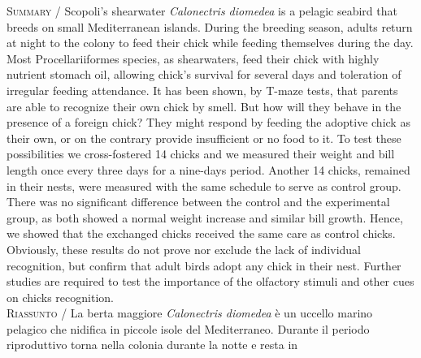 {\small
\noindent \textsc{\color{MUSEBLUE} Summary} / Scopoli{\textquoteright}s shearwater \textit{Calonectris diomedea} is a
pelagic seabird that breeds on small Mediterranean islands. During the
breeding season, adults return at night to the colony to feed their
chick while feeding themselves during the day. Most Procellariiformes
species, as shearwaters, feed their chick with highly nutrient stomach
oil, allowing chick{\textquoteright}s survival for several days and
toleration of irregular feeding attendance. It has been shown, by
T-maze tests, that parents are able to recognize their own chick by
smell. But how will they behave in the presence of a foreign chick? 
They might respond by feeding the adoptive chick as their own, or on
the contrary provide insufficient or no food to it. To test these
possibilities we cross-fostered 14 chicks and we measured their weight
and bill length once every three days for a nine-days period. Another
14 chicks, remained in their nests, were measured with the same
schedule to serve as control group. There was no significant difference
between the control and the experimental group, as both showed a normal
weight increase and similar bill growth. Hence, we showed that the
exchanged chicks received the same care as control chicks. Obviously,
these results do not prove nor exclude the lack of individual
recognition, but confirm that adult birds adopt any chick in their
nest. Further studies are required to test the importance of the
olfactory stimuli and other cues on chicks recognition.  \\
\noindent \textsc{\color{MUSEBLUE} Riassunto} / La berta maggiore \textit{Calonectris diomedea} \`e un uccello marino pelagico che nidifica in piccole isole del Mediterraneo. Durante il
periodo riproduttivo torna nella colonia durante la notte e resta in
}
